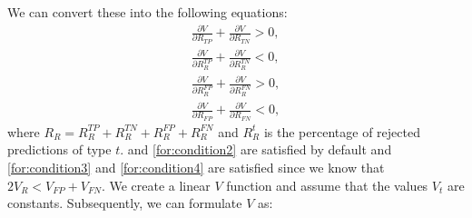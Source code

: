 % 
We can convert these into the following equations:
\begin{subequations}
    \label{for:conditions}
    \begin{align}
        \frac{\partial V}{\partial R_{TP}} + \frac{\partial V}{\partial R_{TN}} > 0 \label{for:condition1},     \\
        \frac{\partial V}{\partial R_R^{TP}} + \frac{\partial V}{\partial R_R^{TN}} < 0 \label{for:condition2}, \\
        \frac{\partial V}{\partial R_R^{FP}} + \frac{\partial V}{\partial R_R^{FN}} > 0 \label{for:condition3}, \\
        \frac{\partial V}{\partial R_{FP}} + \frac{\partial V}{\partial R_{FN}} < 0 \label{for:condition4},
    \end{align}
\end{subequations}
\iffalse
    We can verify that $V$ satisfies the conditions in \ref{for:conditions}:
    \begin{align*}
        \frac{\partial V}{\partial R_{TP}} + \frac{\partial V}{\partial R_{TP}}     & > 0 \\
        V_{TP} + V_{TN} + 2V_R                                                      & > 0 \\
        \\
        \frac{\partial V}{\partial R_R^{TP}} + \frac{\partial V}{\partial R_R^{TN}} & < 0 \\
        -V_{TP} - V_{TN} - 2V_R                                                     & < 0 \\
        \\
        \frac{\partial V}{\partial R_R^{FP}} + \frac{\partial V}{\partial R_R^{FN}} & > 0 \\
        V_{FP} + V_{FN} - 2V_R                                                      & > 0 \\
        \\
        \frac{\partial V}{\partial R_{FP}} + \frac{\partial V}{\partial R_{FN}}     & < 0 \\
        2V_R -V_{FP} - V_{FN}                                                       & < 0
    \end{align*}
\fi %
where $R_R = R_R^{TP} + R_R^{TN} + R_R^{FP} + R_R^{FN}$ and $R_R^t$ is the percentage of rejected predictions of type $t$.  and \ref{for:condition2} are satisfied by default and \ref{for:condition3} and \ref{for:condition4} are satisfied since we know that $2V_R < V_{FP} + V_{FN}$.
\iffalse
    We create a linear $V$ function and assume that the values $V_t$ are constants. Subsequently, we can formulate $V$ as:
